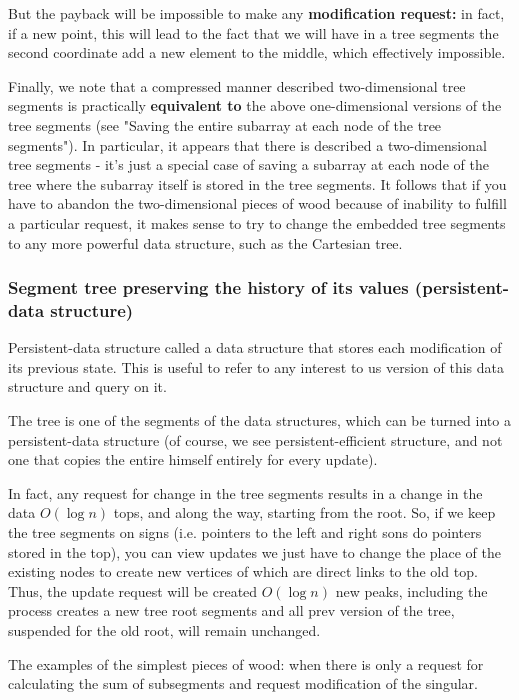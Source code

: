 But the payback will be impossible to make any \textbf{modification request:} in fact, if a new point, this will lead to the fact that we will have in a tree segments the second coordinate add a new element to the middle, which effectively impossible.

Finally, we note that a compressed manner described two-dimensional tree segments is practically \textbf{equivalent to} the above one-dimensional versions of the tree segments (see "Saving the entire subarray at each node of the tree segments"). In particular, it appears that there is described a two-dimensional tree segments - it's just a special case of saving a subarray at each node of the tree where the subarray itself is stored in the tree segments. It follows that if you have to abandon the two-dimensional pieces of wood because of inability to fulfill a particular request, it makes sense to try to change the embedded tree segments to any more powerful data structure, such as the Cartesian tree.

\subsubsection{ Segment tree preserving the history of its values ​​(persistent-data structure) }

Persistent-data structure called a data structure that stores each modification of its previous state. This is useful to refer to any interest to us version of this data structure and query on it.

The tree is one of the segments of the data structures, which can be turned into a persistent-data structure (of course, we see persistent-efficient structure, and not one that copies the entire himself entirely for every update).

In fact, any request for change in the tree segments results in a change in the data $O (\log n)$ tops, and along the way, starting from the root. So, if we keep the tree segments on signs (i.e. pointers to the left and right sons do pointers stored in the top), you can view updates we just have to change the place of the existing nodes to create new vertices of which are direct links to the old top. Thus, the update request will be created $O (\log n)$ new peaks, including the process creates a new tree root segments and all prev version of the tree, suspended for the old root, will remain unchanged.

The examples of the simplest pieces of wood: when there is only a request for calculating the sum of subsegments and request modification of the singular.


